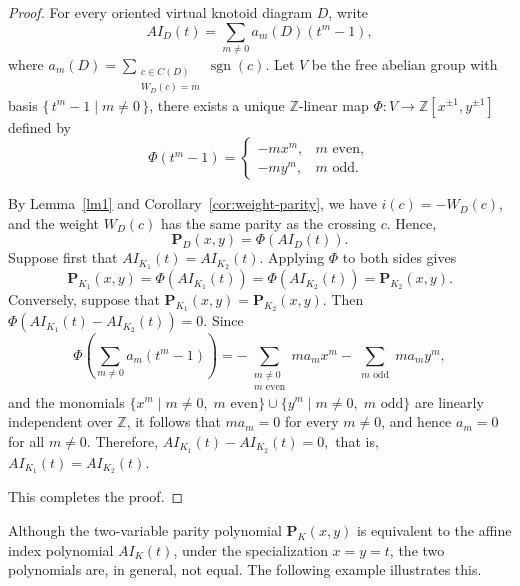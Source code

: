 \documentclass[12pt]{amsart}
\theoremstyle{noparens}
\numberwithin{equation}{section}
\numberwithin{equation}{section}
\begin{document}
\begin{proof}
	For every oriented virtual knotoid diagram $D$, write
	\[
	AI_D(t)=
	\sum_{m\neq0}
	a_m(D)(t^m-1),
	\]
	where
	$
	a_m(D)=
	\sum_{\substack{c\in C(D)\\W_D(c)=m}}
	\operatorname{sgn}(c).
	$
	Let $V$ be the free abelian group with basis
	$\{\,t^m-1\mid m\neq0\,\}$, there exists a unique
	$\mathbb Z$-linear map
	$
	\Phi:V\longrightarrow
	\mathbb Z[x^{\pm1},y^{\pm1}]
	$
	defined by
	\[
	\Phi(t^m-1)=
	\begin{cases}
		-mx^m,&m\text{ even},\\[1ex]
		-my^m,&m\text{ odd}.
	\end{cases}
	\]
	
	By Lemma~\ref{lm1} and Corollary~\ref{cor:weight-parity}, we have
	$i(c)=-W_D(c)$, and the weight $W_D(c)$ has the same parity as the crossing $c$.
	Hence,
	\begin{equation} \label{equ6}
		\mathbf P_D(x,y)
		=
		\Phi(AI_D(t)).	
	\end{equation}
	Suppose first that
	$
	AI_{K_1}(t)=AI_{K_2}(t).
	$
	Applying $\Phi$ to both sides gives
	\[
	\mathbf P_{K_1}(x,y)
	=
	\Phi(AI_{K_1}(t))
	=
	\Phi(AI_{K_2}(t))
	=
	\mathbf P_{K_2}(x,y).
	\]
	Conversely, suppose that
	$
	\mathbf P_{K_1}(x,y)
	=
	\mathbf P_{K_2}(x,y).
	$
	Then
	$
	\Phi\!\left(
	AI_{K_1}(t)-AI_{K_2}(t)
	\right)=0.
	$
	Since
	\[
	\Phi\!\left(
	\sum_{m\neq0}a_m(t^m-1)
	\right)
	=
	-\sum_{\substack{m\neq0\\m\text{ even}}}
	ma_mx^m
	-
	\sum_{\substack{m\text{ odd}}}
	ma_my^m,
	\]
	and the monomials
	$
	\{x^m\mid m\neq0,\;m\text{ even}\}
	\cup
	\{y^m\mid m\neq0,\;m\text{ odd}\}
	$
	are linearly independent over $\mathbb Z$, it follows that
	$ma_m=0$ for every $m\neq0$, and hence $a_m=0$ for all $m\neq0$.
	Therefore,
	$
	AI_{K_1}(t)-AI_{K_2}(t)=0,
	$
	that is,
	$
	AI_{K_1}(t)=AI_{K_2}(t).
	$
	
	This completes the proof.	
\end{proof}

Although the two-variable parity polynomial $\mathbf{P}_K(x,y)$ is equivalent to the affine index polynomial $AI_K(t)$, under the specialization $x=y=t$, the two polynomials are, in general, not equal. The following example illustrates this.
\end{document}
